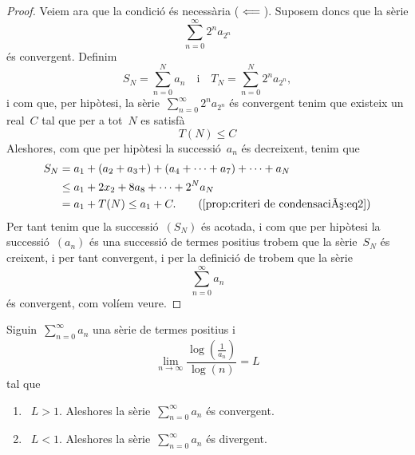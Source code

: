 \documentclass[../../main.tex]{subfiles}
\begin{document}
\begin{proof}
        Veiem ara que la condició és necessària (\(\impliedby\)).
        Suposem doncs que la sèrie
        \[
            \sum_{n=0}^{\infty}2^{n}a_{2^{n}}
        \]
        és convergent.
        Definim
        \[
            S_{N}=\sum_{n=0}^{N}a_{n}\quad\text{i}\quad T_{N}=\sum_{n=0}^{N}2^{n}a_{2^{n}},
        \]
        i com que, per hipòtesi, la sèrie~\(\sum_{n=0}^{\infty}2^{n}a_{2^{n}}\) és convergent tenim que existeix un real~\(C\) tal que per a tot~\(N\) es satisfà
        \begin{equation}
            \label{prop:criteri de condensació:eq2}
            T(N)\leq C
        \end{equation}
        Aleshores, com que per hipòtesi la successió~\(a_{n}\) és decreixent, tenim que
        \begin{align*}
            S_{N}&=a_{1}+(a_{2}+a_{3}+)+(a_{4}+\dots+a_{7})+\dots+a_{N} \\
            &\leq a_{1}+2x_{2}+8a_{8}+\dots+2^{N}a_{N} \\
            &=a_{1}+T(N)\leq a_{1}+C.\tag{\ref{prop:criteri de condensació:eq2}}
        \end{align*}
        Per tant tenim que la successió~\((S_{N})\) és acotada, i com que per hipòtesi la successió~\((a_{n})\) és una successió de termes positius trobem que la sèrie~\(S_{N}\) és creixent, i per tant convergent, %
        i per la definició de  trobem que la sèrie
        \[
            \sum_{n=0}^{\infty}a_{n}
        \]
        és convergent, com volíem veure.
    \end{proof}
    \begin{proposition}
        \label{prop:criteri logarítmic}
        Siguin~\(\sum_{n=0}^{\infty}a_{n}\) una sèrie de termes positius i
        \[
            \lim_{n\to\infty}\frac{\log\left(\frac{1}{a_{n}}\right)}{\log(n)}=L
        \]
        tal que
        \begin{enumerate}
            \item\label{prop:criteri logarítmic:enum1}~\(L>1\).
            Aleshores la sèrie~\(\sum_{n=0}^{\infty}a_{n}\) és convergent.
            \item\label{prop:criteri logarítmic:enum2}~\(L<1\).
            Aleshores la sèrie~\(\sum_{n=0}^{\infty}a_{n}\) és divergent.
        \end{enumerate}
    \end{proposition}
\end{document}
